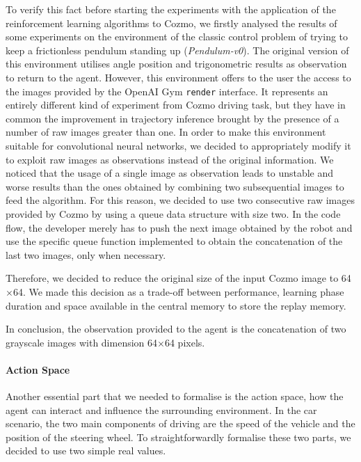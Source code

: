 To verify this fact before starting the experiments with the application of the reinforcement learning algorithms to Cozmo, we firstly analysed the results of some experiments on the environment of the classic control problem of trying to keep a frictionless pendulum standing up (\textit{Pendulum-v0}).
The original version of this environment utilises angle position and trigonometric results as observation to return to the agent.
However, this environment offers to the user the access to the images provided by the OpenAI Gym \texttt{render} interface.
It represents an entirely different kind of experiment from Cozmo driving task, but they have in common the improvement in trajectory inference brought by the presence of a number of raw images greater than one.
In order to make this environment suitable for convolutional neural networks, we decided to appropriately modify it to exploit raw images as observations instead of the original information.
We noticed that the usage of a single image as observation leads to unstable and worse results than the ones obtained by combining two subsequential images to feed the algorithm.
For this reason, we decided to use two consecutive raw images provided by Cozmo by using a queue data structure with size two.
In the code flow, the developer merely has to push the next image obtained by the robot and use the specific queue function implemented to obtain the concatenation of the last two images, only when necessary.

Therefore, we decided to reduce the original size of the input Cozmo image to 64$\times$64.
We made this decision as a trade-off between performance, learning phase duration and space available in the central memory to store the replay memory.

In conclusion, the observation provided to the agent is the concatenation of two grayscale images with dimension 64$\times$64 pixels.

\paragraph{Action Space}

Another essential part that we needed to formalise is the action space, how the agent can interact and influence the surrounding environment.
In the car scenario, the two main components of driving are the speed of the vehicle and the position of the steering wheel.
To straightforwardly formalise these two parts, we decided to use two simple real values.

